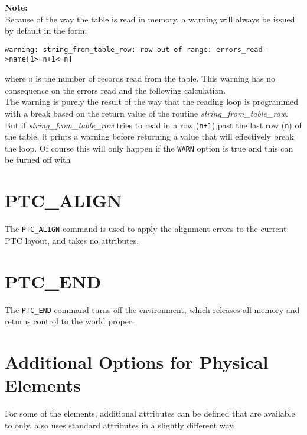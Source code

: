 \textbf{Note:}\\
Because of the way the table is read in memory, a warning will always be
issued by default in the form:
{\small
\begin{verbatim}
warning: string_from_table_row: row out of range: errors_read->name[1>=n+1<=n]
\end{verbatim}
}
where \texttt{n} is  the number of records read from the table. 
This warning has no consequence on the errors read and the following
calculation. \\
The warning is purely the result of the way that the reading loop is
programmed with a break based on the return value of the routine
\textsl{string\_from\_table\_row}.  
But if \textsl{string\_from\_table\_row} tries to read in a row (\texttt{n+1})
past the last row (\texttt{n}) of the table, it prints a warning before
returning a value that will effectively break the loop. Of course this
will only happen if the \texttt{WARN} option is true and this can be turned
off with 

       

\section{PTC\_ALIGN}
\label{sec:ptc-align}

The \texttt{PTC\_ALIGN} command is used to apply the \madx alignment
errors to the current PTC layout, and takes no attributes.



\section{PTC\_END}
\label{sec:ptc-end}

The \texttt{PTC\_END} command turns off the \ptc environment,
which releases all memory and returns control to the \madx world proper.



\section{Additional Options for Physical Elements}
\label{sec:add-option-PTC}

For some of the \madx elements, additional attributes can be defined
that are available to \ptc only. \ptc also uses standard \madx
attributes in a slightly different way.



